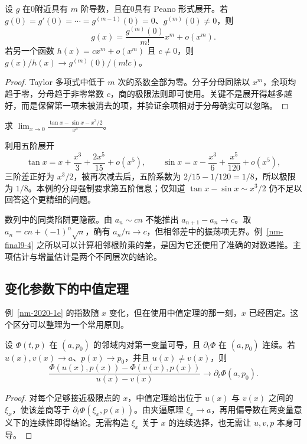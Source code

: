 \documentclass[12pt,fontset=fandol]{ctexart}
\begin{document}
\begin{proposition}\label{supp-taylor}
设 $g$ 在0附近具有 $m$ 阶导数，且在0具有 Peano 形式展开。若 $g(0)=g'(0)=\cdots=g^{(m-1)}(0)=0$、$g^{(m)}(0)\ne0$，则
\[
 g(x)=\frac{g^{(m)}(0)}{m!}x^m+o(x^m).
\]
若另一个函数 $h(x)=cx^m+o(x^m)$ 且 $c\ne0$，则 $g(x)/h(x)\to g^{(m)}(0)/(m!c)$。
\end{proposition}
\begin{proof}
Taylor 多项式中低于 $m$ 次的系数全部为零。分子分母同除以 $x^m$，余项均趋于零，分母趋于非零常数 $c$，商的极限法则即可使用。关键不是展开得越多越好，而是保留第一项未被消去的项，并验证余项相对于分母确实可以忽略。
\end{proof}

\begin{example}
求 $\displaystyle\lim_{x\to0}\frac{\tan x-\sin x-x^3/2}{x^5}$。
\end{example}
\begin{solve}
利用五阶展开
\[
 \tan x=x+\frac{x^3}{3}+\frac{2x^5}{15}+o(x^5),\qquad
 \sin x=x-\frac{x^3}{6}+\frac{x^5}{120}+o(x^5),
\]
三阶差正好为 $x^3/2$，被再次减去后，五阶系数为 $2/15-1/120=1/8$，所以极限为 $1/8$。本例的分母强制要求第五阶信息；仅知道 $\tan x-\sin x\sim x^3/2$ 仍不足以回答这个更精细的问题。
\end{solve}

数列中的同类陷阱更隐蔽。由 $a_n\sim cn$ 不能推出 $a_{n+1}-a_n\to c$。取 $a_n=cn+(-1)^n\sqrt n$，确有 $a_n/n\to c$，但相邻差中的振荡项无界。例~\ref{nm-final9-4} 之所以可以计算相邻根阶乘的差，是因为它还使用了准确的对数递推。主项估计与增量估计是两个不同层次的结论。

\subsection{变化参数下的中值定理}
例~\ref{nm-2020-1e} 的指数随 $x$ 变化，但在使用中值定理的那一刻，$x$ 已经固定。这个区分可以整理为一个常用原则。

\begin{proposition}[带参数差商]\label{supp-param-mvt}
设 $\Phi(t,p)$ 在 $(a,p_0)$ 的邻域内对第一变量可导，且 $\partial_t\Phi$ 在 $(a,p_0)$ 连续。若 $u(x),v(x)\to a$、$p(x)\to p_0$，并且 $u(x)\ne v(x)$，则
\[
 \frac{\Phi(u(x),p(x))-\Phi(v(x),p(x))}{u(x)-v(x)}
 \longrightarrow\partial_t\Phi(a,p_0).
\]
\end{proposition}
\begin{proof}
对每个足够接近极限点的 $x$，中值定理给出位于 $u(x)$ 与 $v(x)$ 之间的 $\xi_x$，使该差商等于 $\partial_t\Phi(\xi_x,p(x))$。由夹逼原理 $\xi_x\to a$，再用偏导数在两变量意义下的连续性即得结论。无需构造 $\xi_x$ 关于 $x$ 的连续选择，也无需让 $u,v,p$ 本身可导。
\end{proof}
\end{document}
